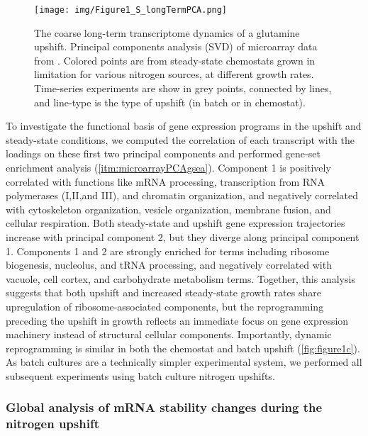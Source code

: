 \begin{figure}[h]
  \texttt{[image: img/Figure1\_S\_longTermPCA.png]}
  \caption{
  The coarse long-term transcriptome dynamics of a glutamine upshift. 
  Principal components analysis (SVD) of microarray data from 
  \cite{airoldi2016steady}. 
  Colored points are from steady-state chemostats grown in
  limitation for various nitrogen sources, at different growth rates.
  Time-series experiments are show in grey points, connected by lines,
  and line-type is the type of upshift (in batch or in chemostat).
  \label{fig:longTermPCA}
  }
\end{figure}

To investigate the functional basis of gene expression programs
in the upshift and steady-state conditions, we computed the
correlation of each transcript with the loadings on these first two
principal components and performed gene-set enrichment analysis
(\autoref{itm:microarrayPCAgsea}). 
Component 1 is positively correlated with functions like
mRNA processing, transcription from RNA polymerases (I,II,and III),
and chromatin organization, and negatively correlated with
cytoskeleton organization,
vesicle organization, membrane fusion, and cellular respiration.
Both steady-state and upshift gene expression
trajectories increase with principal component 2, but they diverge
along principal component 1. Components 1 and 2 are 
strongly enriched for terms including ribosome biogenesis, 
nucleolus, and
tRNA processing, and negatively correlated with
vacuole, cell cortex, and carbohydrate metabolism terms. 
Together, this analysis suggests that both upshift and
increased steady-state growth rates share upregulation of
ribosome-associated components, but the reprogramming
preceding the upshift in growth reflects an immediate focus on 
gene expression machinery instead of structural cellular components.
Importantly,
dynamic reprogramming is similar in both the chemostat and batch
upshift (\autoref{fig:figure1c}). As batch cultures are a technically
simpler experimental system, we performed all subsequent experiments
using batch culture nitrogen upshifts. 

\subsubsection{Global analysis of mRNA stability changes during the
nitrogen upshift}

